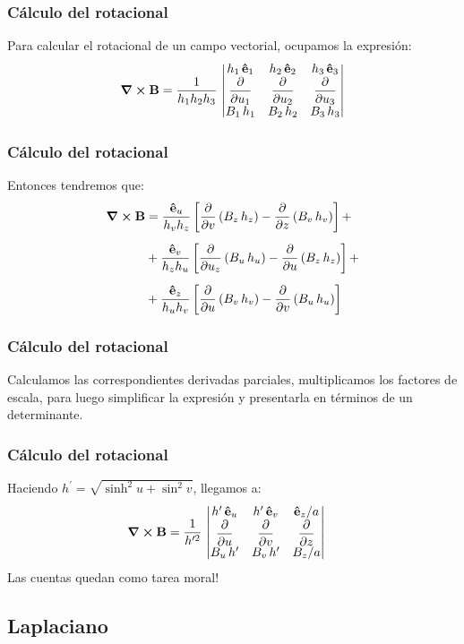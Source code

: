 \documentclass[12pt]{beamer}
\begin{document}
\begin{frame}
\frametitle{Cálculo del rotacional}
Para calcular el rotacional de un campo vectorial, ocupamos la expresión:
\pause
\begin{align*}
\curl{\vb{B}} = \dfrac{1}{h_{1} h_{2} h_{3}} \, \mdet{
h_{1} \, \vu{e}_{1} & h_{2} \, \vu{e}_{2} & h_{3} \, \vu{e}_{3} \\
\displaystyle \pdv{u_{1}} & \displaystyle \pdv{u_{2}} & \displaystyle \pdv{u_{3}} \\
B_{1} \, h_{1} & B_{2} \, h_{2} & B_{3} \, h_{3}
}
\end{align*}
\end{frame}
\begin{frame}
\frametitle{Cálculo del rotacional}
Entonces tendremos que:
\pause
\begin{align*}
\curl{\vb{B}} &= \dfrac{\vu{e}_{u}}{h_{v} h_{z}} \left[ \displaystyle \pdv{v} \left( B_{z} \, h_{z} \right) - \pdv{z} \left( B_{v} \, h_{v} \right) \right] + \\[0.5em]
&+ \dfrac{\vu{e}_{v}}{h_{z} h_{u}} \left[ \displaystyle \pdv{u_{z}} \left( B_{u} \, h_{u} \right) - \pdv{u} \left( B_{z} \, h_{z} \right) \right] + \\[0.5em]
&+ \dfrac{\vu{e}_{z}}{h_{u} h_{v}} \left[ \displaystyle \pdv{u} \left( B_{v} \, h_{v} \right) - \pdv{v} \left( B_{u} \, h_{u} \right) \right]
\end{align*}
\end{frame}
\begin{frame}
\frametitle{Cálculo del rotacional}
Calculamos las correspondientes derivadas parciales, multiplicamos los factores de escala, para luego simplificar la expresión y presentarla en términos de un determinante.
\end{frame}
\begin{frame}
\frametitle{Cálculo del rotacional}
Haciendo $h^{\prime} = \sqrt{\sinh^{2} u + \sin^{2} v}$, llegamos a:
\pause
\begin{align*}
\curl{\vb{B}} &= \dfrac{1}{h^{\prime 2}}  \, \mdet{
h^{\prime} \, \vu{e}_{u} & h^{\prime} \, \vu{e}_{v} & \vu{e}_{z} / a \\
\displaystyle \pdv{u} & \displaystyle \pdv{v} & \displaystyle \pdv{z} \\
B_{u} \, h^{\prime} & B_{v} \, h^{\prime} & B_{z} / a
}
\end{align*}
Las cuentas quedan como tarea moral!
\end{frame}

\subsection{Laplaciano}
\end{document}
